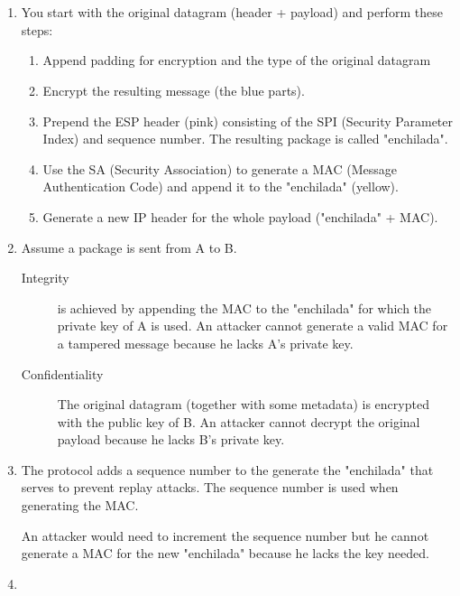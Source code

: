 \documentclass[12pt, a4paper]{article}
\begin{document}
\section{} %
\begin{enumerate}[a]
	\item %
	You start with the original datagram (header + payload) and perform these steps:

	\begin{enumerate}
		\item Append padding for encryption and the type of the original datagram
		\item Encrypt the resulting message (the blue parts).
		\item Prepend the ESP header (pink) consisting of the SPI (Security Parameter Index) and sequence number. The resulting package is called "enchilada".
		\item Use the SA (Security Association) to generate a MAC (Message Authentication Code) and append it to the "enchilada" (yellow).
		\item Generate a new IP header for the whole payload ("enchilada" + MAC).
	\end{enumerate}
	\item %
	Assume a package is sent from A to B.
	\begin{description}
		\item[Integrity] is achieved by appending the MAC to the "enchilada" for which the private key of A is used. An attacker cannot generate a valid MAC for a tampered message because he lacks A's private key.
		\item[Confidentiality] The original datagram (together with some metadata) is encrypted with the public key of B. An attacker cannot decrypt the original payload because he lacks B's private key.
	\end{description}
	\item %
	The protocol adds a sequence number to the generate the "enchilada" that serves to prevent replay attacks. The sequence number is used when generating the MAC.

	An attacker would need to increment the sequence number but he cannot generate a MAC for the new "enchilada" because he lacks the key needed.
	\item %
\end{enumerate}
\end{document}
